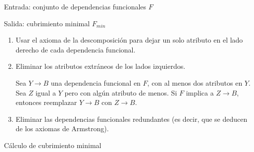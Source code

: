 \documentclass[a4paper, twoside]{article}
\begin{document}
\begin{algorithm}[H]
Entrada: conjunto de dependencias funcionales $F$

Salida: cubrimiento minimal $F_{min}$
\begin{enumerate}
\item Usar el axioma de la descomposición para dejar un solo atributo en
el lado derecho de cada dependencia funcional.
\item Eliminar los atributos extráneos de los lados izquierdos.


Sea $Y\to B$ una dependencia funcional en $F$, con al menos dos
atributos en $Y$. Sea $Z$ igual a $Y$ pero con algún atributo de
menos. Si $F$ implica a $Z\to B$, entonces reemplazar $Y\to B$
con $Z\to B$.

\item Eliminar las dependencias funcionales redundantes (es decir, que se
deducen de los axiomas de Armstrong).
\end{enumerate}
\protect\caption{Cálculo de cubrimiento minimal}


\end{algorithm}
\end{document}
